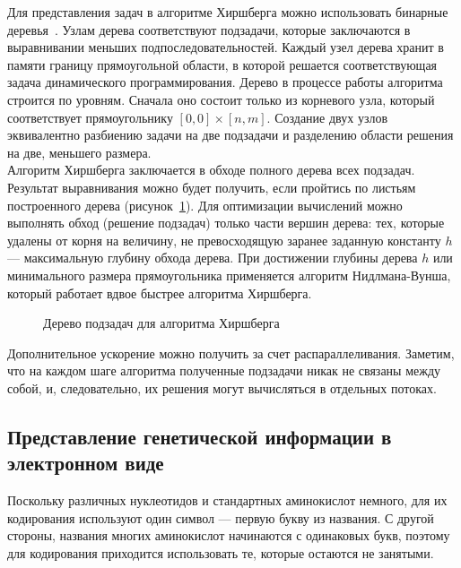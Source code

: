 \indent Для представления задач в алгоритме Хиршберга можно использовать бинарные деревья~\cite{HirshbergParallel}. Узлам дерева соответствуют подзадачи, которые заключаются в выравнивании меньших подпоследовательностей. Каждый узел дерева хранит в памяти границу прямоугольной области, в которой решается соответствующая задача динамического программирования. Дерево в процессе работы алгоритма строится по уровням. Сначала оно состоит только из корневого узла, который соответствует прямоугольнику $[0,0]\times[n,m]$. Создание двух узлов эквивалентно разбиению задачи на две подзадачи и разделению области решения на две, меньшего размера.\\
\indent Алгоритм Хиршберга заключается в обходе полного дерева всех подзадач. Результат выравнивания можно будет получить, если пройтись по листьям построенного дерева (рисунок~\ref{ris:HirshbergExample}). Для оптимизации вычислений можно выполнять обход (решение подзадач) только части вершин дерева: тех, которые удалены от корня на величину, не превосходящую заранее заданную константу $h$ --- максимальную глубину обхода дерева. При достижении глубины дерева $h$ или минимального размера прямоугольника применяется алгоритм Нидлмана-Вунша, который работает вдвое быстрее алгоритма Хиршберга.

\begin{figure}[h]
	\caption{Дерево подзадач для алгоритма Хиршберга}
	\label{ris:HirshbergExample}
\end{figure}

\indent Дополнительное ускорение можно получить за счет распараллеливания. Заметим, что на каждом шаге алгоритма полученные подзадачи никак не связаны между собой, и, следовательно, их решения могут вычисляться в отдельных потоках.

\subsection[Представление генетической информации в электронном виде]{\large Представление генетической информации в электронном виде}
\hspace{\parindent} Поскольку различных нуклеотидов и стандартных аминокислот немного, для их кодирования используют один символ --- первую букву из названия. С другой стороны, названия многих аминокислот начинаются с одинаковых букв, поэтому для кодирования приходится использовать те, которые остаются не занятыми.

